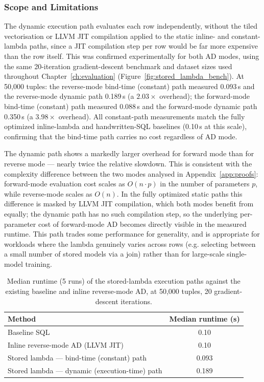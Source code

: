 \documentclass[12pt]{report}
\begin{document}
\subsubsection{Scope and Limitations}

The dynamic execution path evaluates each row independently, without the
tiled vectorisation or LLVM JIT compilation applied to the static inline- and
constant-lambda paths, since a JIT compilation step per row would be far more
expensive than the row itself. This was confirmed experimentally for both AD
modes, using the same 20-iteration gradient-descent benchmark and dataset
sizes used throughout Chapter~\ref{ch:evaluation}
(Figure~\ref{fig:stored_lambda_bench}). At 50{,}000 tuples: the reverse-mode
bind-time (constant) path measured 0.093\,s and the reverse-mode dynamic path
0.189\,s (a $2.03\times$ overhead); the forward-mode bind-time (constant)
path measured 0.088\,s and the forward-mode dynamic path 0.350\,s (a
$3.98\times$ overhead). All constant-path measurements match the fully
optimized inline-lambda and handwritten-SQL baselines (0.10\,s at this
scale), confirming that the bind-time path carries no cost regardless of AD
mode.

The dynamic path shows a markedly larger overhead for forward mode than for
reverse mode --- nearly twice the relative slowdown. This is consistent with
the complexity difference between the two modes analysed in
Appendix~\ref{app:proofs}: forward-mode evaluation cost scales as
$O(n \cdot p)$ in the number of parameters $p$, while reverse-mode scales as
$O(n)$. In the fully optimized static paths this difference is masked by
LLVM JIT compilation, which both modes benefit from equally; the dynamic
path has no such compilation step, so the underlying per-parameter cost of
forward-mode AD becomes directly visible in the measured runtime. This path
trades some performance for generality, and is appropriate for workloads
where the lambda genuinely varies across rows (e.g. selecting between a
small number of stored models via a join) rather than for large-scale
single-model training.

\begin{table}[H]
\centering
\begin{tabular}{lc}
\toprule
Method & Median runtime (s) \\
\midrule
Baseline SQL & 0.10 \\
Inline reverse-mode AD (LLVM JIT) & 0.10 \\
Stored lambda --- bind-time (constant) path & 0.093 \\
Stored lambda --- dynamic (execution-time) path & 0.189 \\
\bottomrule
\end{tabular}
\caption{Median runtime (5 runs) of the stored-lambda execution paths against
the existing baseline and inline reverse-mode AD, at 50{,}000 tuples,
20 gradient-descent iterations.}
\label{tab:stored_lambda_bench}
\end{table}
\end{document}
